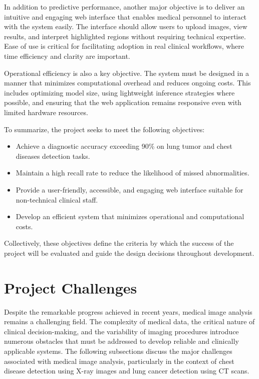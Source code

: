 In addition to predictive performance, another major objective is to deliver an intuitive and engaging web interface that enables medical personnel to interact with the system easily. The interface should allow users to upload images, view results, and interpret highlighted regions without requiring technical expertise. Ease of use is critical for facilitating adoption in real clinical workflows, where time efficiency and clarity are important.

Operational efficiency is also a key objective. The system must be designed in a manner that minimizes computational overhead and reduces ongoing costs. This includes optimizing model size, using lightweight inference strategies where possible, and ensuring that the web application remains responsive even with limited hardware resources.

To summarize, the project seeks to meet the following objectives:

\begin{itemize}
	\item Achieve a diagnostic accuracy exceeding 90\% on lung tumor and chest diseases detection tasks.
	\item Maintain a high recall rate to reduce the likelihood of missed abnormalities.
	\item Provide a user-friendly, accessible, and engaging web interface suitable for non-technical clinical staff.
	\item Develop an efficient system that minimizes operational and computational costs.
\end{itemize}

Collectively, these objectives define the criteria by which the success of the project will be evaluated and guide the design decisions throughout development.

\section{Project Challenges}

Despite the remarkable progress achieved in recent years, medical image analysis remains a challenging field. The complexity of medical data, the critical nature of clinical decision-making, and the variability of imaging procedures introduce numerous obstacles that must be addressed to develop reliable and clinically applicable systems. The following subsections discuss the major challenges associated with medical image analysis, particularly in the context of chest disease detection using X-ray images and lung cancer detection using CT scans.

